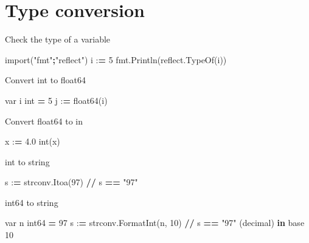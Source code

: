 \documentclass[]{book}
\newenvironment{Shaded}{\begin{snugshade}}{\end{snugshade}}
\newcommand{\BuiltInTok}[1]{#1}
\newcommand{\DecValTok}[1]{\textcolor[rgb]{0.00,0.00,0.81}{#1}}
\newcommand{\FloatTok}[1]{\textcolor[rgb]{0.00,0.00,0.81}{#1}}
\newcommand{\ImportTok}[1]{#1}
\newcommand{\KeywordTok}[1]{\textcolor[rgb]{0.13,0.29,0.53}{\textbf{#1}}}
\newcommand{\NormalTok}[1]{#1}
\newcommand{\OperatorTok}[1]{\textcolor[rgb]{0.81,0.36,0.00}{\textbf{#1}}}
\newcommand{\StringTok}[1]{\textcolor[rgb]{0.31,0.60,0.02}{#1}}
\begin{document}
\hypertarget{type-conversion}{%
\section{Type conversion}\label{type-conversion}}

Check the type of a variable

\begin{Shaded}
\begin{Highlighting}[]
\ImportTok{import}\NormalTok{(}\StringTok{"fmt"}\OperatorTok{;}\StringTok{"reflect"}\NormalTok{)}
\NormalTok{i :}\OperatorTok{=} \DecValTok{5}
\NormalTok{fmt.Println(reflect.TypeOf(i))}
\end{Highlighting}
\end{Shaded}

Convert int to float64

\begin{Shaded}
\begin{Highlighting}[]
\NormalTok{var i }\BuiltInTok{int} \OperatorTok{=} \DecValTok{5}
\NormalTok{j :}\OperatorTok{=}\NormalTok{ float64(i)}
\end{Highlighting}
\end{Shaded}

Convert float64 to in

\begin{Shaded}
\begin{Highlighting}[]
\NormalTok{x :}\OperatorTok{=} \FloatTok{4.0}
\BuiltInTok{int}\NormalTok{(x)}
\end{Highlighting}
\end{Shaded}

int to string

\begin{Shaded}
\begin{Highlighting}[]
\NormalTok{s :}\OperatorTok{=}\NormalTok{ strconv.Itoa(}\DecValTok{97}\NormalTok{) }\OperatorTok{//}\NormalTok{ s }\OperatorTok{==} \StringTok{"97"}
\end{Highlighting}
\end{Shaded}

int64 to string

\begin{Shaded}
\begin{Highlighting}[]
\NormalTok{var n int64 }\OperatorTok{=} \DecValTok{97}
\NormalTok{s :}\OperatorTok{=}\NormalTok{ strconv.FormatInt(n, }\DecValTok{10}\NormalTok{) }\OperatorTok{//}\NormalTok{ s }\OperatorTok{==} \StringTok{"97"}\NormalTok{ (decimal) }\KeywordTok{in}\NormalTok{ base }\DecValTok{10}
\end{Highlighting}
\end{Shaded}
\end{document}
